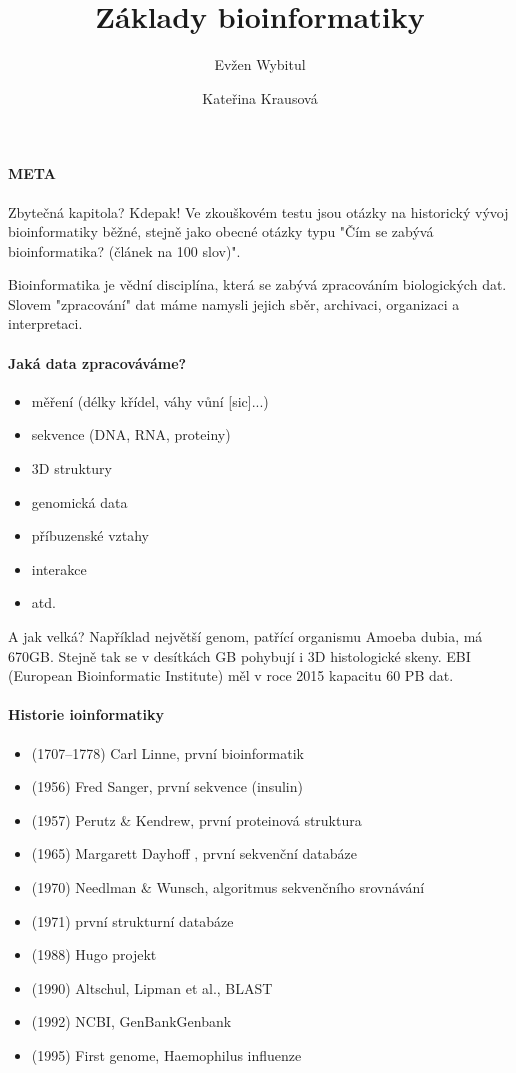 \documentclass[DIV=8]{scrreprt}
\title{Základy bioinformatiky}
\author{Evžen Wybitul \and Kateřina Krausová}
\newcommand{\mybox}[2]{
    \paragraph{#1} #2
}
\begin{document}
\begin{titlepage}
\maketitle
\end{titlepage}
\tableofcontents


\mybox{META}{Zbytečná kapitola? Kdepak! Ve zkouškovém testu jsou otázky na historický vývoj bioinformatiky běžné, stejně jako obecné otázky typu "Čím se zabývá bioinformatika? (článek na 100 slov)".}


Bioinformatika je vědní disciplína, která se zabývá zpracováním biologických dat. Slovem "zpracování" dat máme namysli jejich sběr, archivaci, organizaci a interpretaci.

\paragraph{Jaká data zpracováváme?}
\begin{itemize}[nosep]
    \item měření (délky křídel, váhy vůní [sic]...)
    \item sekvence (DNA, RNA, proteiny)
    \item 3D struktury
    \item genomická data
    \item příbuzenské vztahy
    \item interakce
    \item atd.
\end{itemize}



A jak velká? Například největší genom, patřící organismu Amoeba dubia, má 670GB. Stejně tak se v desítkách GB pohybují i 3D histologické skeny. EBI (European Bioinformatic Institute) měl v roce 2015 kapacitu 60 PB dat.

\paragraph{Historie ioinformatiky}
\begin{itemize}[nosep]
    \item (1707--1778) Carl Linne, první bioinformatik
    \item (1956) Fred Sanger, první sekvence (insulin)
    \item (1957) Perutz & Kendrew, první proteinová struktura
    \item (1965) Margarett Dayhoff , první sekvenční databáze
    \item (1970) Needlman & Wunsch, algoritmus sekvenčního srovnávání
    \item (1971) první strukturní databáze
    \item (1988) Hugo projekt
    \item (1990) Altschul, Lipman et al., BLAST
    \item (1992) NCBI, GenBankGenbank
    \item (1995) First genome, Haemophilus influenze
\end{itemize}
\end{document}
